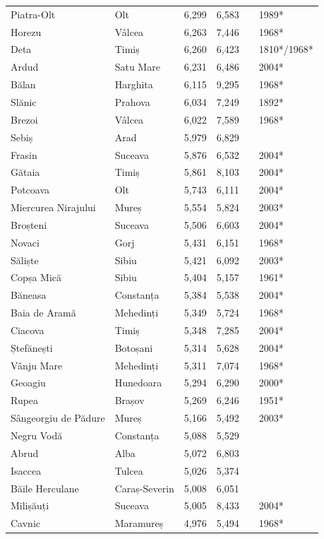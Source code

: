 \documentclass{article}
\begin{document}
\begin{tabular}{llllll}
Piatra-Olt & Olt & 6,299 & 6,583 &  & 1989* \\
Horezu & Vâlcea & 6,263 & 7,446 &  & 1968* \\
Deta & Timiș & 6,260 & 6,423 &  & 1810*/1968* \\
Ardud & Satu Mare & 6,231 & 6,486 &  & 2004* \\
Bălan & Harghita & 6,115 & 9,295 &  & 1968* \\
Slănic & Prahova & 6,034 & 7,249 &  & 1892* \\
Brezoi & Vâlcea & 6,022 & 7,589 &  & 1968* \\
Sebiș & Arad & 5,979 & 6,829 &  &  \\
Frasin & Suceava & 5,876 & 6,532 &  & 2004* \\
Gătaia & Timiș & 5,861 & 8,103 &  & 2004* \\
Potcoava & Olt & 5,743 & 6,111 &  & 2004* \\
Miercurea Nirajului & Mureș & 5,554 & 5,824 &  & 2003* \\
Broșteni & Suceava & 5,506 & 6,603 &  & 2004* \\
Novaci & Gorj & 5,431 & 6,151 &  & 1968* \\
Săliște & Sibiu & 5,421 & 6,092 &  & 2003* \\
Copșa Mică & Sibiu & 5,404 & 5,157 &  & 1961* \\
Băneasa & Constanța & 5,384 & 5,538 &  & 2004* \\
Baia de Aramă & Mehedinți & 5,349 & 5,724 &  & 1968* \\
Ciacova & Timiș & 5,348 & 7,285 &  & 2004* \\
Ștefănești & Botoșani & 5,314 & 5,628 &  & 2004* \\
Vânju Mare & Mehedinți & 5,311 & 7,074 &  & 1968* \\
Geoagiu & Hunedoara & 5,294 & 6,290 &  & 2000* \\
Rupea & Brașov & 5,269 & 6,246 &  & 1951* \\
Sângeorgiu de Pădure & Mureș & 5,166 & 5,492 &  & 2003* \\
Negru Vodă & Constanța & 5,088 & 5,529 &  &  \\
Abrud & Alba & 5,072 & 6,803 &  &  \\
Isaccea & Tulcea & 5,026 & 5,374 &  &  \\
Băile Herculane & Caraș-Severin & 5,008 & 6,051 &  &  \\
Milișăuți & Suceava & 5,005 & 8,433 &  & 2004* \\
Cavnic & Maramureș & 4,976 & 5,494 &  & 1968* \\

\end{tabular}
\end{document}
